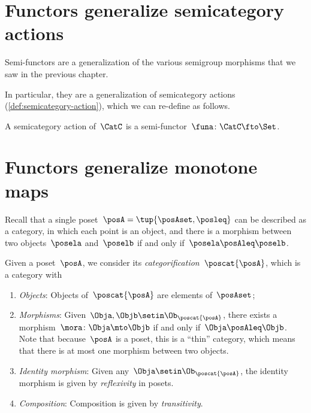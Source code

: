 
\section[\dots as semicategory actions]{Functors generalize semicategory actions}


Semi-functors are a generalization of the various semigroup morphisms that we saw in the previous chapter.


In particular, they are a generalization of semicategory actions (\cref{def:semicategory-action}), which we can re-define as follows.

\begin{ctdefinition}
    A semicategory action of~$\CatC$ is a semi-functor~$\funa\colon \CatC \fto \Set$.
\end{ctdefinition}

\section[\dots as monotone maps]{Functors generalize monotone maps}
\label{sec:posetsarecats}


Recall that a single poset~$\posA=\tup{\posAset, \posleq}$ can be described as a category, in which each point is an object, and there is a morphism between two objects~$\posela$ and~$\poselb$ if and only if~$\posela \posAleq \poselb$.

\begin{ctdefinition}
    Given a poset~$\posA$, we consider its \emph{categorification}~$\poscat{\posA}$, which is a category with
    \begin{enumerate}
        \item \emph{Objects}: Objects of~$\poscat{\posA}$ are elements of~$\posAset$;
        \item \emph{Morphisms}: Given~$\Obja,\Objb\setin \Ob_{\poscat{\posA}}$, there exists a morphism~$\mora\colon \Obja\mto \Objb$ if and only if~$\Obja \posAleq \Objb$.
              Note that because~$\posA$ is a poset, this is a ``thin'' category, which means that there is at most one morphism between two objects.
        \item \emph{Identity morphism}: Given any~$\Obja \setin \Ob_{\poscat{\posA}}$, the identity morphism is given by \emph{reflexivity} in posets.
        \item \emph{Composition}: Composition is given by \emph{transitivity}.
    \end{enumerate}
\end{ctdefinition}

